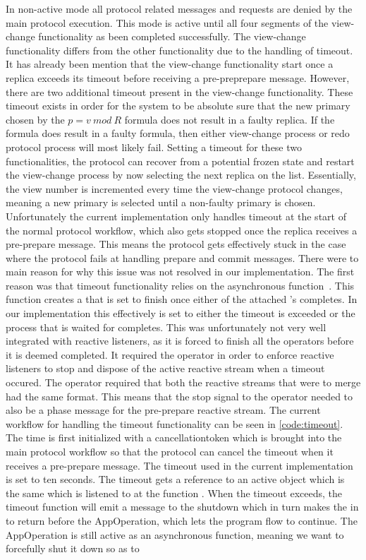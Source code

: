 In non-active mode all protocol related messages and requests are denied by the main protocol execution. This mode is active until all four segments of the view-change functionality as been completed successfully. The view-change functionality differs from the other functionality due to the handling of timeout. It has already been mention that the view-change functionality start once a replica exceeds its timeout before receiving a pre-preprepare message. However, there are two additional timeout present in the view-change functionality. These timeout exists in order for the system to be absolute sure that the new primary chosen by the $p = v ~mod~ R$ formula does not result in a faulty replica. If the formula does result in a faulty formula, then either view-change process or redo protocol process will most likely fail. Setting a timeout for these two functionalities, the protocol can recover from a potential frozen state and restart the view-change process by now selecting the next replica on the list. Essentially, the view number is incremented every time the view-change protocol changes, meaning a new primary is selected until a non-faulty primary is chosen. Unfortunately the current implementation only handles timeout at the start of the normal protocol workflow, which also gets stopped once the replica receives a pre-prepare message. This means the protocol gets effectively stuck in the case where the protocol fails at handling prepare and commit messages. There were to main reason for why this issue was not resolved in our implementation. The first reason was that timeout functionality relies on the  asynchronous function~\cite{WEB:whenany}. This function creates a  that is set to finish once either of the attached 's completes. In our implementation this effectively is set to either the timeout is exceeded or the process that is waited for completes. This was unfortunately not very well integrated with reactive listeners, as it is forced to finish all the operators before it is deemed completed. It required the  operator in order to enforce reactive listeners to stop and dispose of the active reactive stream when a timeout occured. The  operator required that both the reactive streams that were to merge had the same format. This means that the stop signal to the  operator needed to also be a phase message for the pre-prepare reactive stream. The current workflow for handling the timeout functionality can be seen in \autoref{code:timeout}. The time is first initialized with a cancellationtoken which is brought into the main protocol workflow so that the protocol can cancel the timeout when it receives a pre-prepare message. The timeout used in the current implementation is set to ten seconds. The timeout gets a reference to an active  object which is the same  which is listened to at the function . When the timeout exceeds, the timeout function will emit a message to the shutdown  which in turn makes the  in  to return before the AppOperation, which lets the program flow to continue. The AppOperation is still active as an asynchronous function, meaning we want to forcefully shut it down so as to 